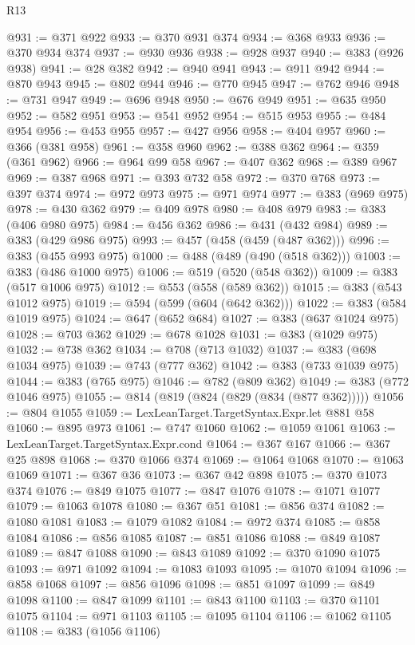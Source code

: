 \begin{lexlean}{R13}
\begin{coremodule}
{{{{{{{{{{{{{{{{{{{{{{{{{{{{{{{{{{{{{{{{{{{{{{{{{{{{{{@931 := @371 @922
@933 := @370 @931 @374
@934 := @368 @933
@936 := @370 @934 @374
@937 := @930 @936
@938 := @928 @937
@940 := @383 (@926 @938)
@941 := @28 @382
@942 := @940 @941
@943 := @911 @942
@944 := @870 @943
@945 := @802 @944
@946 := @770 @945
@947 := @762 @946
@948 := @731 @947
@949 := @696 @948
@950 := @676 @949
@951 := @635 @950
@952 := @582 @951
@953 := @541 @952
@954 := @515 @953
@955 := @484 @954
@956 := @453 @955
@957 := @427 @956
@958 := @404 @957
@960 := @366 (@381 @958)
@961 := @358 @960
@962 := @388 @362
@964 := @359 (@361 @962)
@966 := @964 @99 @58
@967 := @407 @362
@968 := @389 @967
@969 := @387 @968
@971 := @393 @732 @58
@972 := @370 @768
@973 := @397 @374
@974 := @972 @973
@975 := @971 @974
@977 := @383 (@969 @975)
@978 := @430 @362
@979 := @409 @978
@980 := @408 @979
@983 := @383 (@406 @980 @975)
@984 := @456 @362
@986 := @431 (@432 @984)
@989 := @383 (@429 @986 @975)
@993 := @457 (@458 (@459 (@487 @362)))
@996 := @383 (@455 @993 @975)
@1000 := @488 (@489 (@490 (@518 @362)))
@1003 := @383 (@486 @1000 @975)
@1006 := @519 (@520 (@548 @362))
@1009 := @383 (@517 @1006 @975)
@1012 := @553 (@558 (@589 @362))
@1015 := @383 (@543 @1012 @975)
@1019 := @594 (@599 (@604 (@642 @362)))
@1022 := @383 (@584 @1019 @975)
@1024 := @647 (@652 @684)
@1027 := @383 (@637 @1024 @975)
@1028 := @703 @362
@1029 := @678 @1028
@1031 := @383 (@1029 @975)
@1032 := @738 @362
@1034 := @708 (@713 @1032)
@1037 := @383 (@698 @1034 @975)
@1039 := @743 (@777 @362)
@1042 := @383 (@733 @1039 @975)
@1044 := @383 (@765 @975)
@1046 := @782 (@809 @362)
@1049 := @383 (@772 @1046 @975)
@1055 := @814 (@819 (@824 (@829 (@834 (@877 @362)))))
@1056 := @804 @1055
@1059 := LexLeanTarget.TargetSyntax.Expr.let @881 @58
@1060 := @895 @973
@1061 := @747 @1060
@1062 := @1059 @1061
@1063 := LexLeanTarget.TargetSyntax.Expr.cond
@1064 := @367 @167
@1066 := @367 @25 @898
@1068 := @370 @1066 @374
@1069 := @1064 @1068
@1070 := @1063 @1069
@1071 := @367 @36
@1073 := @367 @42 @898
@1075 := @370 @1073 @374
@1076 := @849 @1075
@1077 := @847 @1076
@1078 := @1071 @1077
@1079 := @1063 @1078
@1080 := @367 @51
@1081 := @856 @374
@1082 := @1080 @1081
@1083 := @1079 @1082
@1084 := @972 @374
@1085 := @858 @1084
@1086 := @856 @1085
@1087 := @851 @1086
@1088 := @849 @1087
@1089 := @847 @1088
@1090 := @843 @1089
@1092 := @370 @1090 @1075
@1093 := @971 @1092
@1094 := @1083 @1093
@1095 := @1070 @1094
@1096 := @858 @1068
@1097 := @856 @1096
@1098 := @851 @1097
@1099 := @849 @1098
@1100 := @847 @1099
@1101 := @843 @1100
@1103 := @370 @1101 @1075
@1104 := @971 @1103
@1105 := @1095 @1104
@1106 := @1062 @1105
@1108 := @383 (@1056 @1106)
}}}}}}}}}}}}}}}}}}}}}}}}}}}}}}}}}}}}}}}}}}}}}}}}}}}}}}
\end{coremodule}
\end{lexlean}
